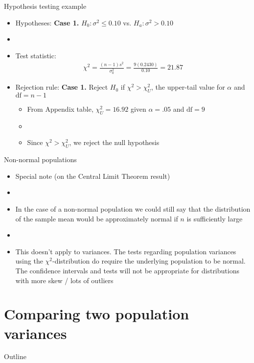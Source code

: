 \documentclass[xcolor=dvipsnames]{beamer}
\begin{document}
\begin{frame}{Hypothesis testing example}
	\begin{itemize}
		\item Hypotheses: \textbf{Case 1.} $H_0: \sigma^2 \leq 0.10$ vs. $H_a: \sigma^2 > 0.10$
		\item[]
		\item Test statistic:
		\begin{gather*}
		\chi^2 = \frac{(n-1)s^2}{\sigma_0^2} = \frac{9 (0.2430)}{0.10} =  21.87
		\end{gather*}
		\item Rejection rule: \textbf{Case 1.} Reject $H_0$ if $\chi^2 > \chi_U^2$, the upper-tail value for $\alpha$ and $\text{df} = n-1$
		\begin{itemize}
			\item From Appendix table, $\chi^2_U = 16.92$ given $\alpha = .05$ and $\text{df} = 9$
			\item[]
			\item Since $\chi^2 > \chi^2_U$, we reject the null hypothesis
		\end{itemize}
	\end{itemize}
\end{frame}

\begin{frame}{Non-normal populations}
	\begin{itemize}
		\item Special note (on the Central Limit Theorem result)
		\item[]
		\item In the case of a non-normal population we could still say that the distribution of the sample mean would be approximately normal if $n$ is sufficiently large
		\item[]
		\item This doesn't apply to variances. The tests regarding population variances using the $\chi^2$-distribution do require the underlying population to be normal. The confidence intervals and tests will not be appropriate for distributions with more skew / lots of outliers
	\end{itemize}
\end{frame}

\section{Comparing two population variances}
\begin{frame}{Outline}
	\tableofcontents[currentsection,subsectionstyle=show/shaded/hide]
\end{frame}
\end{document}
